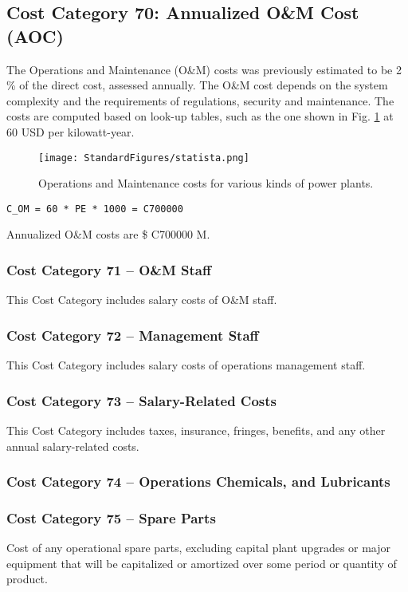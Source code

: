 \subsection{Cost Category 70: Annualized O\&M Cost (AOC)}

The Operations and Maintenance (O\&M) costs was previously estimated to be 2 \% of the direct cost, assessed annually.  The O\&M cost depends on the system complexity and the requirements of regulations, security and maintenance. The costs are computed based on look-up tables, such as the one shown in Fig. \ref{fig:statista} at 60 USD per kilowatt-year.  

\begin{figure}[b!] 
\centering 
\texttt{[image: StandardFigures/statista.png]} 
\caption{Operations and Maintenance costs for various kinds of power plants.} 
\label{fig:statista} 
\end{figure} 

\begin{verbatim} 
C_OM = 60 * PE * 1000 = C700000  
\end{verbatim} 

Annualized O\&M costs are \$ C700000 M.

\subsubsection*{Cost Category 71 – O\&M Staff}
This Cost Category includes salary costs of O\&M staff.

\subsubsection*{Cost Category 72 – Management Staff}
This Cost Category includes salary costs of operations management staff.

\subsubsection*{Cost Category 73 – Salary-Related Costs}
This Cost Category includes taxes, insurance, fringes, benefits, and any other annual salary-related costs.

\subsubsection*{Cost Category 74 – Operations Chemicals, and Lubricants}

\subsubsection*{Cost Category 75 – Spare Parts}
Cost of any operational spare parts, excluding capital plant upgrades or major equipment that will be capitalized or amortized over some period or quantity of product.\\

